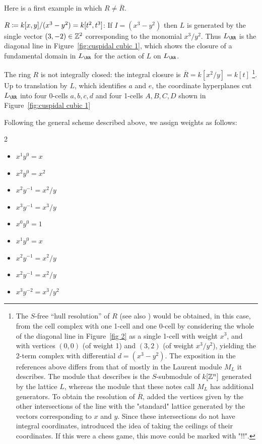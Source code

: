 \documentclass{amsart}
\begin{document}
Here is a first example in which $R \neq \overline R$.

\begin{example} 
  \label{ex:cuspidal-cubic}
  $R\coloneqq k[x,y]/(x^3-y^2) = k[t^{2},t^{3}]$:
If $I = (x^3-y^2)$ then $L$ is generated by the single vector
$ (3,-2) \in \mathbb Z^2$ corresponding to the monomial $x^3/y^2$. Thus
$L_\RR$ is the diagonal line in Figure~\ref{fig:cuspidal cubic 1}, which
shows the closure of a fundamental domain in $L_\RR$ for the action of $L$
on $L_\RR$.

The ring $R$ is not integrally closed: the integral closure is $\overline R = k[x^{2}/y] = k[t]$
\footnote{The $S$-free ``hull resolution'' of $R$ \cite[Section 3]{BS98} (see also \cite[Sections 9.2--9.3]{MillerSturmfels2004}) would be obtained, in this case, from the cell complex with one 1-cell and one 0-cell by considering the whole of the diagonal line in Figure~\ref{fig 2} as a single 1-cell with weight $x^3$, and with vertices
$(0,0)$ (of weight 1) and $(3,2)$ (of weight $x^3/y^2$), yielding the 2-term complex with differential
$d = (x^3-y^2)$.
The exposition in the references above differs from
that of \cite{BCS+25} mostly in the Laurent module $M_L$ it describes. The module that \cite{BS98} describes is the $S$-submodule of $k[\mathbb Z^n]$ generated by the lattice $L$, whereas the module that these notes call $M_L$ has additional generators.
To obtain the resolution of $\overline R$, \cite{BCS+25} added the vertices given by
the other intersections of the line with the "standard" lattice generated
by the vectors corresponding to $x$ and $y$. Since these intersections do not have integral coordinates, \cite{BCS+25} introduced the idea of taking the ceilings of 
their coordinates. 
If this were a chess game, this move could be marked with "!!".}.
Up to translation by $L$, which identifies $a$ and $e$, the coordinate hyperplanes cut $L_\RR$ into four 0-cells $a,b,c,d$ and four 1-cells $A,B,C,D$ shown in Figure~\ref{fig:cuspidal cubic 1} 

\goodbreak


Following the general scheme described above, we assign weights as follows:
\begin{multicols}{2}
  \begin{itemize}
  \item[$\Psi(A)$:] $x^1y^0 = x$
  \item[$\Psi(B)$:] $x^2y^0 = x^2$
  \item[$\Psi(C)$:] $x^2y^{-1} = x^2/y$
  \item[$\Psi(D)$:] $x^3y^{-1} = x^3/y$
    \smallskip
  \item[$\Psi(a)$:] $x^0y^0 = 1$
  \item[$\Psi(b)$:] $x^1y^0 = x$
  \item[$\Psi(c)$:] $x^2y^{-1} = x^2/y$
  \item[$\Psi(d)$:] $x^2y^{-1} = x^2/y$
  \item[$\Psi(e)$:] $x^3y^{-2} = x^3/y^{2}$
  \end{itemize}
\end{multicols}


\end{example}
\end{document}
